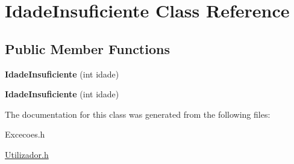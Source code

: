 \hypertarget{class_idade_insuficiente}{}\section{Idade\+Insuficiente Class Reference}
\label{class_idade_insuficiente}
\subsection*{Public Member Functions}
\begin{DoxyCompactItemize}
\item 
\hypertarget{class_idade_insuficiente_a3343305dda977a7ff7af6ebc5d2808f1}{}{\bfseries Idade\+Insuficiente} (int idade)\label{class_idade_insuficiente_a3343305dda977a7ff7af6ebc5d2808f1}

\item 
\hypertarget{class_idade_insuficiente_a3343305dda977a7ff7af6ebc5d2808f1}{}{\bfseries Idade\+Insuficiente} (int idade)\label{class_idade_insuficiente_a3343305dda977a7ff7af6ebc5d2808f1}

\end{DoxyCompactItemize}


The documentation for this class was generated from the following files\+:\begin{DoxyCompactItemize}
\item 
Excecoes.\+h\item 
\hyperlink{_utilizador_8h}{Utilizador.\+h}\end{DoxyCompactItemize}
